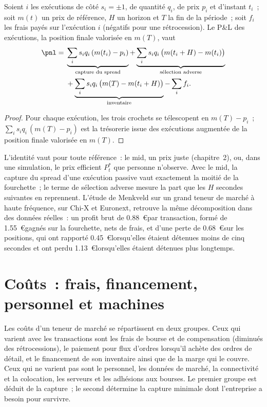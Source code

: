 \begin{proposition}\label{prop:hf:the-business-of-market-making:split}
Soient $i$ les exécutions de côté $s_i=\pm1$, de quantité $q_i$, de prix $p_i$ et d'instant $t_i$~; soit $m(t)$ un prix de référence, $H$ un horizon et $T$ la fin de
la période~; soit $f_i$ les frais payés sur l'exécution $i$ (négatifs pour une rétrocession). Le P\&L des exécutions, la position finale valorisée en $m(T)$, vaut
\begin{align*}
\pnl={}&\underbrace{\sum_i s_iq_i\,(m(t_i)-p_i)}_{\text{capture du spread}}
+\underbrace{\sum_i s_iq_i\,\bigl(m(t_i+H)-m(t_i)\bigr)}_{\text{sélection adverse}}\\
&+\underbrace{\sum_i s_iq_i\,\bigl(m(T)-m(t_i+H)\bigr)}_{\text{inventaire}}-\sum_i f_i .
\end{align*}
\end{proposition}

\begin{proof}
Pour chaque exécution, les trois crochets se télescopent en $m(T)-p_i$~; $\sum_i s_iq_i\,(m(T)-p_i)$ est la trésorerie issue des exécutions augmentée de la position finale valorisée en
$m(T)$.
\end{proof}

L'identité vaut pour toute référence~: le mid, un prix juste (chapitre~2), ou, dans une simulation, le prix efficient $P^\ast_t$ que personne n'observe. Avec
le mid, la capture du spread d'une exécution passive vaut exactement la moitié de la fourchette~; le terme de sélection adverse mesure la part que les $H$ secondes suivantes en
reprennent. L'étude de Menkveld sur un grand teneur de marché à haute fréquence, sur Chi-X et Euronext, retrouve la même décomposition dans des données réelles~: un profit brut de
0.88~\euro par transaction, formé de 1.55~\euro gagnés sur la fourchette, nets de frais, et d'une perte de 0.68~\euro sur les positions, qui ont rapporté 0.45~\euro lorsqu'elles étaient
détenues moins de cinq secondes et ont perdu 1.13~\euro lorsqu'elles étaient détenues plus longtemps.

\section{Coûts~: frais, financement, personnel et machines}

Les coûts d'un teneur de marché se répartissent en deux groupes. Ceux qui varient avec les transactions sont les frais de bourse et de compensation (diminués des rétrocessions), le paiement pour flux d'ordres
lorsqu'il achète des ordres de détail, et le financement de son inventaire ainsi que de la marge qui le couvre. Ceux qui ne varient pas sont le personnel, les données de marché,
la connectivité et la colocation, les serveurs et les adhésions aux bourses. Le premier groupe est déduit de la capture~; le second détermine la capture minimale dont
l'entreprise a besoin pour survivre.

